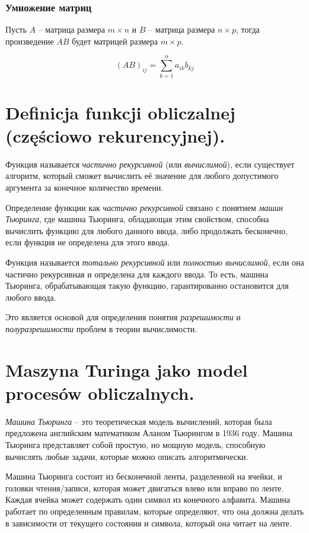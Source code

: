 \subsubsection{Умножение матриц}

Пусть $A$ -- матрица размера $m \times n$ и $B$ -- матрица размера $n \times p$, тогда произведение $AB$ будет матрицей размера $m \times p$.

\[
(AB)_{ij} = \sum_{k=1}^n a_{ik}b_{kj}
\]



\section{Definicja funkcji obliczalnej (częściowo rekurencyjnej).}

Функция называется \textit{частично рекурсивной} (или \textit{вычислимой}), если существует алгоритм, который сможет вычислить её значение для любого допустимого аргумента за конечное количество времени.

Определение функции как \textit{частично рекурсивной} связано с понятием \textit{машин Тьюринга}, где машина Тьюринга, обладающая этим свойством, способна вычислить функцию для любого данного ввода, либо продолжать бесконечно, если функция не определена для этого ввода.

Функция называется \textit{тотально рекурсивной} или \textit{полностью вычислимой}, если она частично рекурсивная и определена для каждого ввода. То есть, машина Тьюринга, обрабатывающая такую функцию, гарантированно остановится для любого ввода.

Это является основой для определения понятия \textit{разрешимости} и \textit{полуразрешимости} проблем в теории вычислимости.

\section{Maszyna Turinga jako model procesów obliczalnych. }

\textit{Машина Тьюринга} -- это теоретическая модель вычислений, которая была предложена английским математиком Аланом Тьюрингом в 1936 году. Машина Тьюринга представляет собой простую, но мощную модель, способную вычислять любые задачи, которые можно описать алгоритмически.

Машина Тьюринга состоит из бесконечной ленты, разделенной на ячейки, и головки чтения/записи, которая может двигаться влево или вправо по ленте. Каждая ячейка может содержать один символ из конечного алфавита. Машина работает по определенным правилам, которые определяют, что она должна делать в зависимости от текущего состояния и символа, который она читает на ленте.

